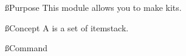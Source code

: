 \ss{Purpose}
This module allows you to make kits.

\ss{Concept}
A  is a set of itemstack.

\ss{Command}

